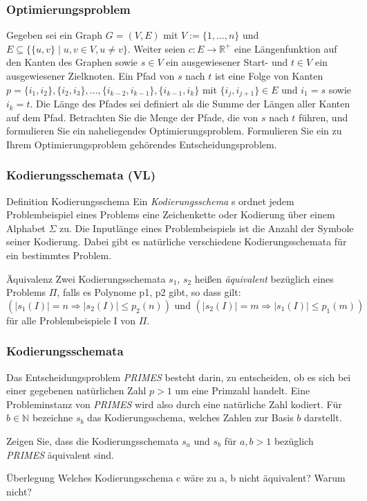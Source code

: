 \documentclass{beamer}
\begin{document}
\begin{frame}
 \frametitle{Optimierungsproblem}
 Gegeben sei ein Graph $G=(V,E)$ mit $V:=\{1,\ldots,n\}$ und $E\subseteq \{\{u,v\} \mid u,v \in V, u\neq v\}$. Weiter seien $c:E \rightarrow \mathbb{R}^+$ eine Längenfunktion auf den Kanten des Graphen sowie $s\in V$ ein ausgewiesener Start- und $t\in V$ ein ausgewiesener Zielknoten. 
Ein Pfad von $s$ nach $t$ ist eine Folge von Kanten $p = \{i_1,i_2\},\{i_2,i_3\},\ldots,\{i_{k-2},i_{k-1}\},\{i_{k-1},i_k\}$ mit $\{i_j, i_{j+1}\} \in E$ und $i_1=s$ sowie $i_k=t$. 
Die Länge des Pfades sei definiert als die Summe der Längen aller Kanten auf dem Pfad. 
Betrachten Sie die Menge der Pfade, die von $s$ nach $t$ führen, und formulieren Sie ein naheliegendes Optimierungsproblem. 
Formulieren Sie ein zu Ihrem Optimierungsproblem gehörendes Entscheidungsproblem.
\end{frame}

\begin{frame}
 \frametitle{Kodierungsschemata (VL)}
 \begin{block}{Definition Kodierungsschema}
 Ein \emph{Kodierungsschema} s ordnet jedem Problembeispiel eines Problems eine Zeichenkette oder Kodierung über einem Alphabet $\Sigma$ zu. 
 Die Inputlänge eines Problembeispiels ist die Anzahl der Symbole seiner Kodierung.
 Dabei gibt es natürliche verschiedene Kodierungsschemata für ein bestimmtes Problem.
 \end{block}
 \begin{block}{Äquivalenz}
  Zwei Kodierungsschemata $s_1$, $s_2$ heißen \emph{äquivalent} bezüglich eines Problems $\Pi$, falls es Polynome p1, p2 gibt, so dass gilt:
  \[
   (|s_1(I)| = n \Rightarrow |s_2(I)| \leq p_2(n))\mbox{ und } (|s_2(I)| = m \Rightarrow |s_1(I)| \leq p_1(m))
  \]
für alle Problembeispiele I von $\Pi$.
 \end{block}
\end{frame}

\begin{frame}
 \frametitle{Kodierungsschemata}
 Das Entscheidungsproblem \textit{PRIMES} besteht darin, zu entscheiden, ob es sich bei einer gegebenen natürlichen Zahl $p>1$ um eine Primzahl handelt. 
Eine Probleminstanz von \textit{PRIMES} wird also durch eine natürliche Zahl kodiert. 
Für $b\in \mathbb{N}$ bezeichne $s_b$ das Kodierungsschema, welches Zahlen zur Basis $b$ darstellt.

Zeigen Sie, dass die Kodierungsschemata $s_a$ und $s_b$ für $a,b>1$ bezüglich \textit{PRIMES} äquivalent sind.

\begin{block}{Überlegung}
 Welches Kodierungsschema c wäre zu a, b nicht äquivalent? Warum nicht?
\end{block}
\end{frame}
\end{document}
